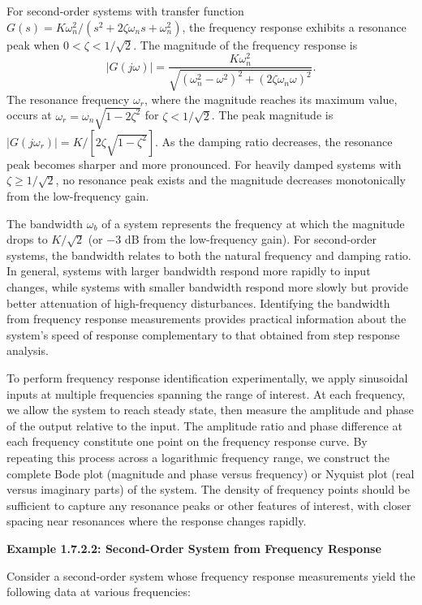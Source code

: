 For second-order systems with transfer function $G(s) = K\omega_n^2/(s^2 + 2\zeta\omega_n s + \omega_n^2)$, the frequency response exhibits a resonance peak when $0 < \zeta < 1/\sqrt{2}$. The magnitude of the frequency response is
\[
|G(j\omega)| = \frac{K\omega_n^2}{\sqrt{(\omega_n^2 - \omega^2)^2 + (2\zeta\omega_n\omega)^2}}.
\]
The resonance frequency $\omega_r$, where the magnitude reaches its maximum value, occurs at $\omega_r = \omega_n\sqrt{1 - 2\zeta^2}$ for $\zeta < 1/\sqrt{2}$. The peak magnitude is $|G(j\omega_r)| = K/[2\zeta\sqrt{1-\zeta^2}]$. As the damping ratio decreases, the resonance peak becomes sharper and more pronounced. For heavily damped systems with $\zeta \geq 1/\sqrt{2}$, no resonance peak exists and the magnitude decreases monotonically from the low-frequency gain.

The bandwidth $\omega_b$ of a system represents the frequency at which the magnitude drops to $K/\sqrt{2}$ (or $-3$ dB from the low-frequency gain). For second-order systems, the bandwidth relates to both the natural frequency and damping ratio. In general, systems with larger bandwidth respond more rapidly to input changes, while systems with smaller bandwidth respond more slowly but provide better attenuation of high-frequency disturbances. Identifying the bandwidth from frequency response measurements provides practical information about the system's speed of response complementary to that obtained from step response analysis.

To perform frequency response identification experimentally, we apply sinusoidal inputs at multiple frequencies spanning the range of interest. At each frequency, we allow the system to reach steady state, then measure the amplitude and phase of the output relative to the input. The amplitude ratio and phase difference at each frequency constitute one point on the frequency response curve. By repeating this process across a logarithmic frequency range, we construct the complete Bode plot (magnitude and phase versus frequency) or Nyquist plot (real versus imaginary parts) of the system. The density of frequency points should be sufficient to capture any resonance peaks or other features of interest, with closer spacing near resonances where the response changes rapidly.

\textbf{Example 1.7.2.2: Second-Order System from Frequency Response}

Consider a second-order system whose frequency response measurements yield the following data at various frequencies:

